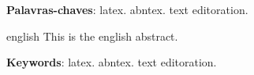 \setlength{\absparsep}{18pt} %
\begin{resumo}
    \lipsum[7]    
	\vspace{\onelineskip}
	\noindent 
	\textbf{Palavras-chaves}: latex. abntex. text editoration.
\end{resumo}

\begin{resumo}[Abstract]
 \begin{otherlanguage*}{english}
   This is the english abstract.
   \lipsum[7]
   \vspace{\onelineskip}
 
   \noindent 
   \textbf{Keywords}: latex. abntex. text editoration.
 \end{otherlanguage*}
\end{resumo}
